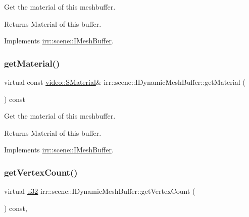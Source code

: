 Get the material of this meshbuffer. 

\begin{DoxyReturn}{Returns}
Material of this buffer. 
\end{DoxyReturn}


Implements \hyperlink{classirr_1_1scene_1_1IMeshBuffer_a341c1da2fd0cd556a15aab06d07dbbaa}{irr\+::scene\+::\+I\+Mesh\+Buffer}.

\mbox{\label{classirr_1_1scene_1_1IDynamicMeshBuffer_a3be83e4819e9f79a3d9b264eb8bf4cfc}} 
\subsubsection{\texorpdfstring{get\+Material()}{getMaterial()}\hspace{0.1cm}{\footnotesize\ttfamily [4/4]}}
{\footnotesize\ttfamily virtual const \hyperlink{classirr_1_1video_1_1SMaterial}{video\+::\+S\+Material}\& irr\+::scene\+::\+I\+Dynamic\+Mesh\+Buffer\+::get\+Material (\begin{DoxyParamCaption}{ }\end{DoxyParamCaption}) const\hspace{0.3cm}{\ttfamily [pure virtual]}}



Get the material of this meshbuffer. 

\begin{DoxyReturn}{Returns}
Material of this buffer. 
\end{DoxyReturn}


Implements \hyperlink{classirr_1_1scene_1_1IMeshBuffer_a341c1da2fd0cd556a15aab06d07dbbaa}{irr\+::scene\+::\+I\+Mesh\+Buffer}.

\mbox{\label{classirr_1_1scene_1_1IDynamicMeshBuffer_afc317a8ccda7e7eceb1f4955c90848d2}} 
\subsubsection{\texorpdfstring{get\+Vertex\+Count()}{getVertexCount()}\hspace{0.1cm}{\footnotesize\ttfamily [1/2]}}
{\footnotesize\ttfamily virtual \hyperlink{namespaceirr_a0416a53257075833e7002efd0a18e804}{u32} irr\+::scene\+::\+I\+Dynamic\+Mesh\+Buffer\+::get\+Vertex\+Count (\begin{DoxyParamCaption}{ }\end{DoxyParamCaption}) const\hspace{0.3cm}{\ttfamily [inline]}, {\ttfamily [virtual]}}




